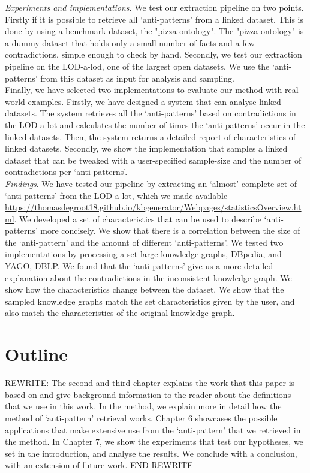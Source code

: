 \documentclass[11pt,letterpaper ,oneside ]{book}
\begin{document}
	\textit{Experiments and implementations}. We test our extraction pipeline on two points. Firstly if it is possible to retrieve all `anti-patterns' from a linked dataset. This is done by using a benchmark dataset, the "pizza-ontology". The "pizza-ontology" is a dummy dataset that holds only a small number of facts and a few contradictions, simple enough to check by hand. Secondly, we test our extraction pipeline on the LOD-a-lod, one of the largest open datasets. We use the `anti-patterns' from this dataset as input for analysis and sampling.\\
	
	Finally, we have selected two implementations to evaluate our method with real-world examples. Firstly, we have designed a system that can analyse linked datasets. The system retrieves all the  `anti-patterns' based on contradictions in the LOD-a-lot and calculates the number of times the `anti-patterns' occur in the linked datasets. Then, the system returns a detailed report of characteristics of linked datasets.
	Secondly, we show the implementation that samples a linked dataset that can be tweaked with a user-specified sample-size and the number of contradictions per `anti-patterns'. \\
	
	\textit{Findings}. We have tested our pipeline by extracting an `almost' complete set of `anti-patterns' from the LOD-a-lot\cite{JavierD:2017}, which we made available \\ \url{https://thomasdegroot18.github.io/kbgenerator/Webpages/statisticsOverview.html}. We developed a set of characteristics that can be used to describe `anti-patterns' more concisely. 
	We show that there is a correlation between the size of the `anti-pattern' and the amount of different `anti-patterns'. 
	We tested two implementations by processing a set large knowledge graphs, DBpedia\cite{DBpedia}, and YAGO\cite{YAGO}, DBLP\cite{DBLP}.
	We found that the `anti-patterns' give us a more detailed explanation about the contradictions in the inconsistent knowledge graph. 
	We show how the characteristics change between the dataset. We show that the sampled knowledge graphs match the set characteristics given by the user, and also match the characteristics of the original knowledge graph.\\
	
	\section{Outline}
	REWRITE:
	The second and third chapter explains the work that this paper is based on and give background information to the reader about the definitions that we use in this work. In the method, we explain more in detail how the method of `anti-pattern' retrieval works. Chapter 6 showcases the possible applications that make extensive use from the `anti-pattern' that we retrieved in the method. In Chapter 7, we show the experiments that test our hypotheses, we set in the introduction, and analyse the results. We conclude with a conclusion, with an extension of future work.
	END REWRITE
	
\end{document}
